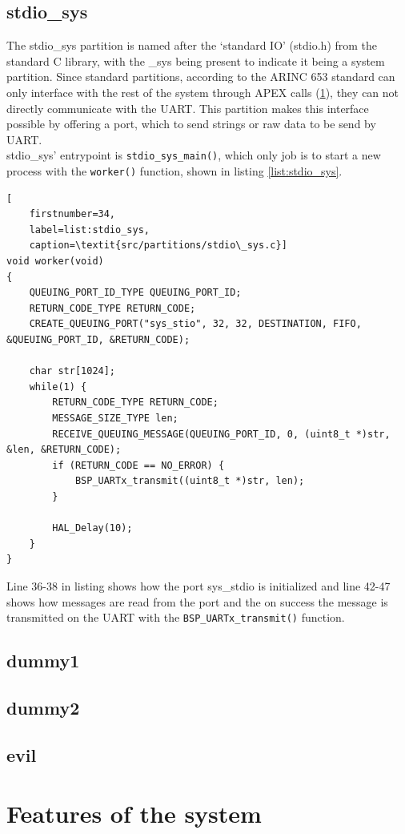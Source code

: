 \subsection{stdio\_sys}
The stdio\_sys partition is named after the `standard IO' (stdio.h) from the
standard C library, with the \_sys being present to indicate it being a system
partition. Since standard partitions, according to the ARINC 653 standard can
only interface with the rest of the system through APEX calls (\ref{}), they can
not directly communicate with the UART. This partition makes this interface
possible by offering a port, which to send strings or raw data to be send by
UART.\\

stdio\_sys' entrypoint is \texttt{stdio\_sys\_main()}, which only job is to
start a new process with the \texttt{worker()} function, shown in listing
\ref{list:stdio_sys}.

\begin{minipage}{\linewidth}
\begin{lstlisting}[
	firstnumber=34,
	label=list:stdio_sys,
	caption=\textit{src/partitions/stdio\_sys.c}]
void worker(void)
{
    QUEUING_PORT_ID_TYPE QUEUING_PORT_ID;
    RETURN_CODE_TYPE RETURN_CODE;
    CREATE_QUEUING_PORT("sys_stio", 32, 32, DESTINATION, FIFO, &QUEUING_PORT_ID, &RETURN_CODE);

    char str[1024];
    while(1) {
        RETURN_CODE_TYPE RETURN_CODE;
        MESSAGE_SIZE_TYPE len;
        RECEIVE_QUEUING_MESSAGE(QUEUING_PORT_ID, 0, (uint8_t *)str, &len, &RETURN_CODE);
        if (RETURN_CODE == NO_ERROR) {
            BSP_UARTx_transmit((uint8_t *)str, len);
        }

        HAL_Delay(10);
    }
}
\end{lstlisting}
\end{minipage}

Line 36-38 in listing shows how the port sys\_stdio is initialized and line
42-47 shows how messages are read from the port and the on success the message
is transmitted on the UART with the \texttt{BSP\_UARTx\_transmit()} function.

\subsection{dummy1}

\subsection{dummy2}

\subsection{evil}


\section{Features of the system}
